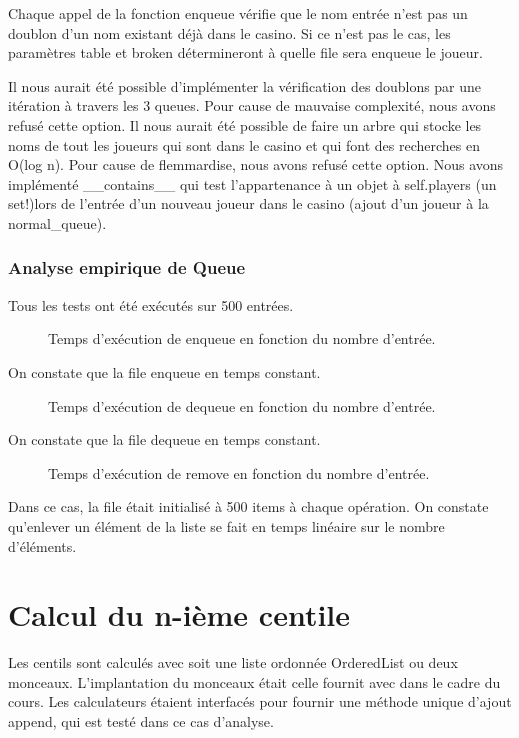 \documentclass[french]{article}
\begin{document}
Chaque appel de la fonction enqueue vérifie que le nom entrée n'est pas un
doublon d'un nom existant déjà dans le casino. Si ce n'est pas le cas, les
paramètres table et broken détermineront à quelle file sera enqueue le joueur.

Il nous aurait été possible d'implémenter la vérification des doublons par une
itération à travers les 3 queues. Pour cause de mauvaise complexité, nous
avons refusé cette option. Il nous aurait été possible de faire un arbre qui
stocke les noms de tout les joueurs qui sont dans le casino et qui font des
recherches en O(log n). Pour cause de flemmardise, nous avons refusé cette
option. Nous avons implémenté \_\_contains\_\_ qui test l'appartenance à un
objet à self.players (un set!)lors de l'entrée d'un nouveau joueur dans le
casino (ajout d'un joueur à la normal\_queue).

\subsubsection{Analyse empirique de \textsf{Queue}}
Tous les tests ont été exécutés sur 500 entrées.

\begin{figure}
\caption{Temps d'exécution de \textsf{enqueue} en fonction du nombre d'entrée.}
\end{figure}
On constate que la file enqueue en temps constant.

\begin{figure}
\caption{Temps d'exécution de \textsf{dequeue} en fonction du nombre d'entrée.}
\end{figure}
On constate que la file dequeue en temps constant.

\begin{figure}
\caption{Temps d'exécution de \textsf{remove} en fonction du nombre d'entrée.}
\end{figure}
Dans ce cas, la file était initialisé à 500 items à chaque opération. On
constate qu'enlever un élément de la liste se fait en temps linéaire sur le
nombre d'éléments.

\section{Calcul du n-ième centile}
Les centils sont calculés avec soit une liste ordonnée \textsf{OrderedList} ou
deux monceaux. L'implantation du monceaux était celle fournit avec dans le cadre
du cours. Les calculateurs étaient interfacés pour fournir une méthode unique
d'ajout \textsf{append}, qui est testé dans ce cas d'analyse.
\end{document}

